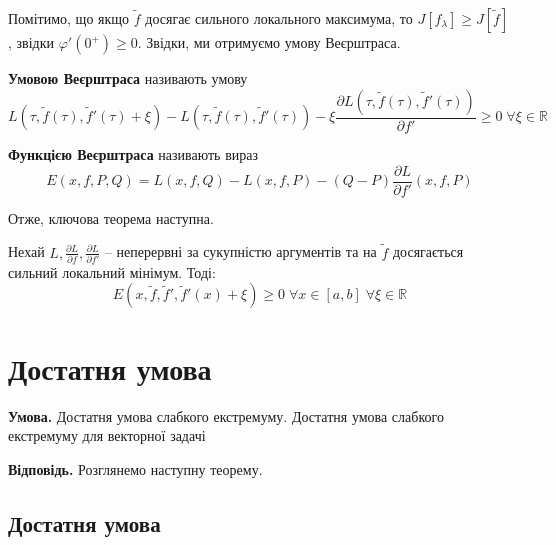 \documentclass[14pt]{extarticle}
\newcommand{\<}{\langle}
\renewcommand{\>}{\rangle}
\theoremstyle{mystyle}{\newtheorem{definition}{Definition}[section]}
\theoremstyle{mystyle}{\newtheorem{proposition}[definition]{Proposition}}
\theoremstyle{mystyle}{\newtheorem{theorem}[definition]{Theorem}}
\theoremstyle{mystyle}{\newtheorem{lemma}[definition]{Lemma}}
\theoremstyle{mystyle}{\newtheorem{corollary}[definition]{Corollary}}
\theoremstyle{mystyle}{\newtheorem*{remark}{Remark}}
\theoremstyle{mystyle}{\newtheorem*{remarks}{Remarks}}
\theoremstyle{mystyle}{\newtheorem*{example}{Example}}
\theoremstyle{mystyle}{\newtheorem*{examples}{Examples}}
\theoremstyle{definition}{\newtheorem*{exercise}{Exercise}}
\theoremstyle{cstyle}{\newtheorem*{cthm}{}}
\theoremstyle{warn}
\begin{document}
Помітимо, що якщо $\widetilde{f}$ досягає сильного локального максимума, то $J[f_{\lambda}] \geq J[\widetilde{f}]$, звідки $\varphi'(0^+) \geq 0$. Звідки, ми отримуємо умову Веєрштраса.

\begin{definition}
    \textbf{Умовою Веєрштраса} називають умову
    \begin{equation}
        L(\tau,\widetilde{f}(\tau),\widetilde{f}'(\tau)+\xi)-L(\tau,\widetilde{f}(\tau),\widetilde{f}'(\tau))-\xi \frac{\partial L(\tau,\widetilde{f}(\tau),\widetilde{f}'(\tau))}{\partial f'} \geq 0 \; \forall \xi \in \mathbb{R}
    \end{equation}
\end{definition}

\begin{definition}
    \textbf{Функцією Веєрштраса} називають вираз
    \begin{equation}
        E(x,f,P,Q) = L(x,f,Q) - L(x,f,P) - (Q-P)\frac{\partial L}{\partial f'}(x,f,P)
    \end{equation}
\end{definition}

Отже, ключова теорема наступна.

\begin{theorem}
    Нехай $L,\frac{\partial L}{\partial f},\frac{\partial L}{\partial f'}$ -- неперервні за сукупністю аргументів та на $\widetilde{f}$ досягається сильний локальний мінімум. Тоді:
    \begin{equation}
        E(x,\widetilde{f},\widetilde{f}',\widetilde{f}'(x)+\xi) \geq 0 \; \forall x \in [a,b] \; \forall \xi \in \mathbb{R}
    \end{equation}
\end{theorem}

\pagebreak

\section{Достатня умова}

\textbf{Умова.} Достатня умова слабкого екстремуму. Достатня умова слабкого екстремуму для векторної
задачі

\textbf{Відповідь.} Розглянемо наступну теорему.

\subsection{Достатня умова}
\end{document}
